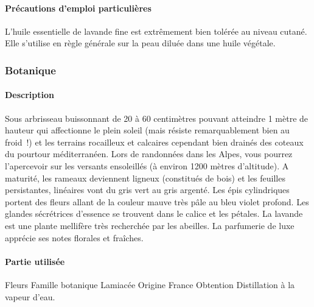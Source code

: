 \documentclass[12pt,a4wide]{article}
\begin{document}
\paragraph{Précautions d'emploi particulières}
\label{sec-4-7-1-4}
L'huile essentielle de lavande fine est extrêmement bien tolérée au niveau cutané. Elle s'utilise en règle générale sur la peau diluée dans une huile végétale.

\subsubsection{Botanique}
\label{sec-4-7-2}
\paragraph{Description}
\label{sec-4-7-2-1}
Sous arbrisseau buissonnant de 20 à 60 centimètres pouvant atteindre 1 mètre de hauteur qui affectionne le plein soleil (mais résiste remarquablement bien au froid !) et les terrains rocailleux et calcaires cependant bien drainés des coteaux du pourtour méditerranéen. Lors de randonnées dans les Alpes, vous pourrez l'apercevoir sur les versants ensoleillés (à environ 1200 mètres d'altitude). A maturité, les rameaux deviennent ligneux (constitués de bois) et les feuilles persistantes, linéaires vont du gris vert au gris argenté. Les épis cylindriques portent des fleurs allant de la couleur mauve très pâle au bleu violet profond. Les glandes sécrétrices d'essence se trouvent dans le calice et les pétales. La lavande est une plante mellifère très recherchée par les abeilles. La parfumerie de luxe apprécie ses notes florales et fraîches.
\paragraph{Partie utilisée}
\label{sec-4-7-2-2}
Fleurs
Famille botanique                
Lamiacée
Origine
France
Obtention
Distillation à la vapeur d'eau.
\end{document}
